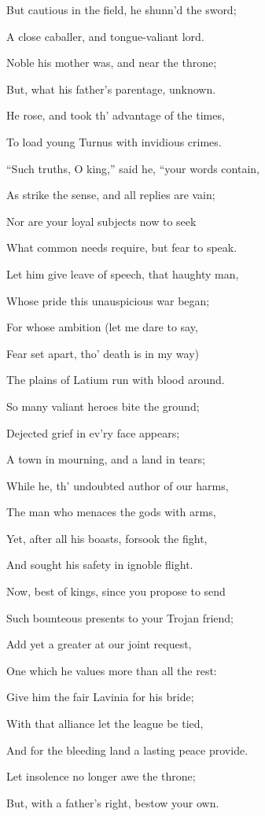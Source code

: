 But cautious in the field, he shunn’d the sword;

A close caballer, and tongue-valiant lord.

Noble his mother was, and near the throne;

But, what his father’s parentage, unknown.

He rose, and took th’ advantage of the times,

To load young Turnus with invidious crimes.

“Such truths, O king,” said he, “your words contain,

As strike the sense, and all replies are vain;

Nor are your loyal subjects now to seek

What common needs require, but fear to speak.

Let him give leave of speech, that haughty man,

Whose pride this unauspicious war began;

For whose ambition (let me dare to say,

Fear set apart, tho’ death is in my way)

The plains of Latium run with blood around.

So many valiant heroes bite the ground;

Dejected grief in ev’ry face appears;

A town in mourning, and a land in tears;

While he, th’ undoubted author of our harms,

The man who menaces the gods with arms,

Yet, after all his boasts, forsook the fight,

And sought his safety in ignoble flight.

Now, best of kings, since you propose to send

Such bounteous presents to your Trojan friend;

Add yet a greater at our joint request,

One which he values more than all the rest:

Give him the fair Lavinia for his bride;

With that alliance let the league be tied,

And for the bleeding land a lasting peace provide.

Let insolence no longer awe the throne;

But, with a father’s right, bestow your own.

